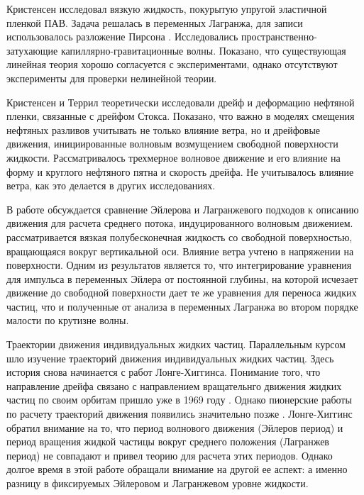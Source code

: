 Кристенсен \cite{christensen2005drift,christensen2005wave} исследовал вязкую жидкость, покурытую упругой эластичной пленкой ПАВ. Задача решалась в переменных Лагранжа, для записи использовалось разложение Пирсона \cite{pierson1962perturbation}. Исследовались пространственно-затухающие капиллярно-гравитационные волны. Показано, что существующая линейная теория хорошо согласуется с экспериментами, однако отсутствуют эксперименты для проверки нелинейной теории.

Кристенсен и Террил \cite{christensen2009drift} теоретически исследовали дрейф и деформацию нефтяной пленки, связанные с дрейфом Стокса. Показано, что важно в моделях смещения нефтяных разливов учитывать не только влияние ветра, но и дрейфовые движения, инициированные волновым возмущением свободной поверхности жидкости. Рассматривалось трехмерное волновое движение и его влияние на форму и круглого нефтяного пятна и скорость дрейфа. Не учитывалось влияние ветра, как это делается в других исследованиях.

В работе \cite{weber2006eulerian} обсуждается сравнение Эйлерова и Лагранжевого подходов к описанию движения для расчета среднего потока, индуцированного волновым движением. рассматривается вязкая полубесконечная жидкость со свободной поверхностью, вращающаяся вокруг вертикальной оси. Влияние ветра учтено в напряжении на поверхности. Одним из результатов является то, что интегрирование уравнения для импульса в переменных Эйлера от постоянной глубины, на которой исчезает движение до свободной поверхности дает те же уравнения для переноса жидких частиц, что и полученные от анализа в переменных Лагранжа во втором порядке малости по крутизне волны.




Траектории движения индивидуальных жидких частиц.
Параллельным курсом шло изучение траекторий движения индивидуальных жидких частиц. Здесь история снова начинается с работ Лонге-Хиггинса. Понимание того, что направление дрейфа связано с направлением вращательнго движения жидких частиц по своим орбитам пришло уже в 1969 году \cite{longuet1969nonlinear}. Однако пионерские работы по расчету траекторий движения появились значительно позже \cite{longuet1979trajectories,longuet1986eulerian}. Лонге-Хиггинс обратил внимание на то, что период волнового движения (Эйлеров период) и период вращения жидкой частицы вокруг среднего положения (Лагранжев период) не совпадают и привел теорию для расчета этих периодов. Однако долгое время в этой работе обращали внимание на другой ее аспект: а именно разницу в фиксируемых Эйлеровом и Лагранжевом уровне жидкости. 


